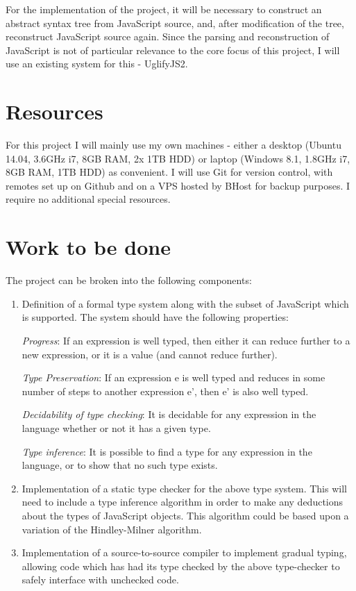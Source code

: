 For the implementation of the project, it will be necessary to construct
an abstract syntax tree from JavaScript source, and, after modification
of the tree, reconstruct JavaScript source again. Since the parsing and
reconstruction of JavaScript is not of particular relevance to the core
focus of this project, I will use an existing system for this - UglifyJS2.

\section{Resources}\label{resources}

For this project I will mainly use my own machines - either a desktop
(Ubuntu 14.04, 3.6GHz i7, 8GB RAM, 2x 1TB HDD) or laptop (Windows 8.1,
1.8GHz i7, 8GB RAM, 1TB HDD) as convenient. I will use Git for version
control, with remotes set up on Github and on a VPS hosted by BHost for
backup purposes. I require no additional special resources.

\section{Work to be done}\label{work-to-be-done}

The project can be broken into the following components:
\begin{enumerate}
\def\labelenumi{\arabic{enumi}.}
\item
  Definition of a formal type system along with the subset of JavaScript
  which is supported. The system should have the following properties:
  
  \emph{Progress}: If an expression is well typed, then either it can
  reduce further to a new expression, or it is a value (and cannot
  reduce further). 

  \emph{Type Preservation}: If an expression e is well
  typed and reduces in some number of steps to another expression e',
  then e' is also well typed. 
  
  \emph{Decidability of type checking}: It is
  decidable for any expression in the language whether or not it has a
  given type. 
  
  \emph{Type inference}: It is possible to find a type for
  any expression in the language, or to show that no such type exists.
\item
  Implementation of a static type checker for the above type system.
  This will need to include a type inference algorithm in order to make
  any deductions about the types of JavaScript objects. This algorithm
  could be based upon a variation of the Hindley-Milner algorithm.
\item
  Implementation of a source-to-source compiler to implement gradual
  typing, allowing code which has had its type checked by the above
  type-checker to safely interface with unchecked code.
\end{enumerate}

